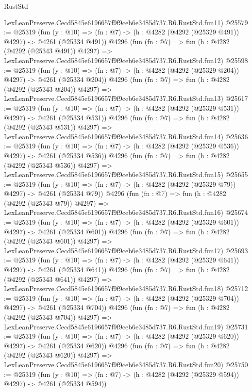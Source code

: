 \begin{lexlean}{RustStd}
\begin{coremodule}
    LexLeanPreserve.Cecd5845e6196657f9f9ceb6e3485d737.R6.RustStd.fun11)
@25579 := @25319
    (fun (y : @10) => (fn : @7) -> (h : @4282 (@4292 (@25329 @491)) @4297) -> @4261 (@25334 @491))
    @4296
    (fun (fn : @7) =>
    fun (h : @4282 (@4292 (@25343 @491)) @4297) =>
    LexLeanPreserve.Cecd5845e6196657f9f9ceb6e3485d737.R6.RustStd.fun12)
@25598 := @25319
    (fun (y : @10) => (fn : @7) -> (h : @4282 (@4292 (@25329 @204)) @4297) -> @4261 (@25334 @204))
    @4296
    (fun (fn : @7) =>
    fun (h : @4282 (@4292 (@25343 @204)) @4297) =>
    LexLeanPreserve.Cecd5845e6196657f9f9ceb6e3485d737.R6.RustStd.fun13)
@25617 := @25319
    (fun (y : @10) => (fn : @7) -> (h : @4282 (@4292 (@25329 @531)) @4297) -> @4261 (@25334 @531))
    @4296
    (fun (fn : @7) =>
    fun (h : @4282 (@4292 (@25343 @531)) @4297) =>
    LexLeanPreserve.Cecd5845e6196657f9f9ceb6e3485d737.R6.RustStd.fun14)
@25636 := @25319
    (fun (y : @10) => (fn : @7) -> (h : @4282 (@4292 (@25329 @536)) @4297) -> @4261 (@25334 @536))
    @4296
    (fun (fn : @7) =>
    fun (h : @4282 (@4292 (@25343 @536)) @4297) =>
    LexLeanPreserve.Cecd5845e6196657f9f9ceb6e3485d737.R6.RustStd.fun15)
@25655 := @25319
    (fun (y : @10) => (fn : @7) -> (h : @4282 (@4292 (@25329 @79)) @4297) -> @4261 (@25334 @79))
    @4296
    (fun (fn : @7) =>
    fun (h : @4282 (@4292 (@25343 @79)) @4297) =>
    LexLeanPreserve.Cecd5845e6196657f9f9ceb6e3485d737.R6.RustStd.fun16)
@25674 := @25319
    (fun (y : @10) => (fn : @7) -> (h : @4282 (@4292 (@25329 @601)) @4297) -> @4261 (@25334 @601))
    @4296
    (fun (fn : @7) =>
    fun (h : @4282 (@4292 (@25343 @601)) @4297) =>
    LexLeanPreserve.Cecd5845e6196657f9f9ceb6e3485d737.R6.RustStd.fun17)
@25693 := @25319
    (fun (y : @10) => (fn : @7) -> (h : @4282 (@4292 (@25329 @641)) @4297) -> @4261 (@25334 @641))
    @4296
    (fun (fn : @7) =>
    fun (h : @4282 (@4292 (@25343 @641)) @4297) =>
    LexLeanPreserve.Cecd5845e6196657f9f9ceb6e3485d737.R6.RustStd.fun18)
@25712 := @25319
    (fun (y : @10) => (fn : @7) -> (h : @4282 (@4292 (@25329 @704)) @4297) -> @4261 (@25334 @704))
    @4296
    (fun (fn : @7) =>
    fun (h : @4282 (@4292 (@25343 @704)) @4297) =>
    LexLeanPreserve.Cecd5845e6196657f9f9ceb6e3485d737.R6.RustStd.fun19)
@25731 := @25319
    (fun (y : @10) => (fn : @7) -> (h : @4282 (@4292 (@25329 @620)) @4297) -> @4261 (@25334 @620))
    @4296
    (fun (fn : @7) =>
    fun (h : @4282 (@4292 (@25343 @620)) @4297) =>
    LexLeanPreserve.Cecd5845e6196657f9f9ceb6e3485d737.R6.RustStd.fun20)
@25750 := @25319
    (fun (y : @10) => (fn : @7) -> (h : @4282 (@4292 (@25329 @594)) @4297) -> @4261 (@25334 @594))

\end{coremodule}
\end{lexlean}
